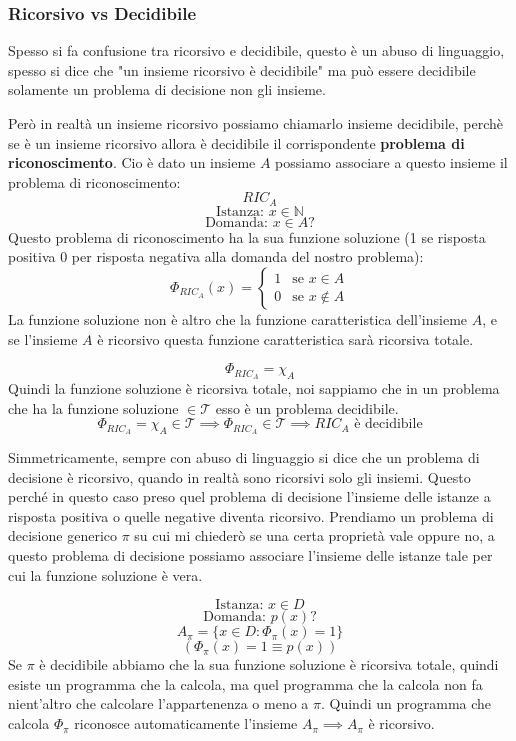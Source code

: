 \documentclass{article}
\begin{document}
\subsubsection{Ricorsivo vs Decidibile}
Spesso si fa confusione tra ricorsivo e decidibile, questo è un abuso di linguaggio,
spesso si dice che "un insieme ricorsivo è decidibile" ma può essere decidibile
solamente un problema di decisione non gli insieme.

Però in realtà un insieme ricorsivo
possiamo chiamarlo insieme decidibile, perchè se è un insieme ricorsivo allora è decidibile
il corrispondente \textbf{problema di riconoscimento}. Cio è dato un insieme $A$ possiamo
associare a questo insieme il problema di riconoscimento:
$$RIC_A$$
$$\text{Istanza: }x\in\mathbb{N}$$
$$\text{Domanda: }x\in A?$$
Questo problema di riconoscimento ha la sua funzione soluzione (1 se risposta
positiva 0 per risposta negativa alla domanda del nostro problema):
\[
    \Phi_{RIC_A}(x)=
    \begin{cases}
        1 & \text{se }x\in A    \\
        0 & \text{se }x\notin A
    \end{cases}
\]
La funzione soluzione non è altro che la funzione caratteristica dell'insieme $A$,
e se l'insieme $A$ è ricorsivo questa funzione caratteristica sarà ricorsiva totale.

$$\Phi_{RIC_A}=\chi_A$$
Quindi la funzione soluzione è ricorsiva totale, noi sappiamo che in un problema
che ha la funzione soluzione $\in\mathcal{T}$ esso è un problema decidibile.
$$\Phi_{RIC_A}=\chi_A\in\mathcal{T}\implies\Phi_{RIC_A}\in\mathcal{T}\implies RIC_A\text{ è decidibile}$$

Simmetricamente, sempre con abuso di linguaggio si dice che un problema di decisione è
ricorsivo, quando in realtà sono ricorsivi solo gli insiemi. Questo perché in questo
caso preso quel problema di decisione l'insieme delle istanze a risposta positiva
o quelle negative diventa ricorsivo.
Prendiamo un problema di decisione generico $\pi$ su cui mi chiederò se una certa
proprietà vale oppure no, a questo problema di decisione possiamo associare l'insieme
delle istanze tale per cui la funzione soluzione è vera.

$$\text{Istanza: }x\in D$$
$$\text{Domanda: }p(x)?$$
$$A_\pi=\{x\in D:\Phi_\pi(x)=1\}$$
$$\left(\Phi_\pi(x)=1\equiv p(x)\right)$$
Se $\pi$ è decidibile abbiamo che la sua funzione soluzione è ricorsiva totale, quindi
esiste un programma che la calcola, ma quel programma che la calcola non fa nient'altro che
calcolare l'appartenenza o meno a $\pi$. Quindi un programma che calcola $\Phi_\pi$
riconosce automaticamente l'insieme $A_\pi\implies A_\pi$ è ricorsivo.
\end{document}

